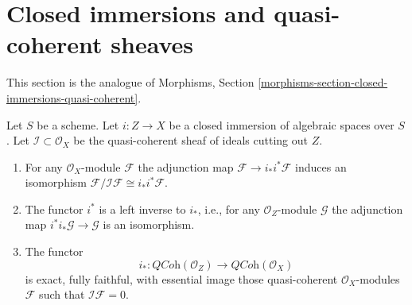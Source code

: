 \section{Closed immersions and quasi-coherent sheaves}
\label{section-closed-immersions-quasi-coherent}

\noindent
This section is the analogue of
Morphisms, Section \ref{morphisms-section-closed-immersions-quasi-coherent}.

\begin{lemma}
\label{lemma-i-star-equivalence}
Let $S$ be a scheme. Let $i : Z \to X$ be a closed immersion of algebraic
spaces over $S$. Let $\mathcal{I} \subset \mathcal{O}_X$ be the quasi-coherent
sheaf of ideals cutting out $Z$.
\begin{enumerate}
\item For any $\mathcal{O}_X$-module $\mathcal{F}$ the adjunction map
$\mathcal{F} \to i_*i^*\mathcal{F}$ induces an isomorphism
$\mathcal{F}/\mathcal{I}\mathcal{F} \cong i_*i^*\mathcal{F}$.
\item The functor $i^*$ is a left inverse to $i_*$, i.e., for any
$\mathcal{O}_Z$-module $\mathcal{G}$ the adjunction map
$i^*i_*\mathcal{G} \to \mathcal{G}$ is an isomorphism.
\item The functor
$$
i_* :
\textit{QCoh}(\mathcal{O}_Z)
\longrightarrow
\textit{QCoh}(\mathcal{O}_X)
$$
is exact, fully faithful, with essential image those quasi-coherent
$\mathcal{O}_X$-modules $\mathcal{F}$ such that $\mathcal{I}\mathcal{F} = 0$.
\end{enumerate}
\end{lemma}

